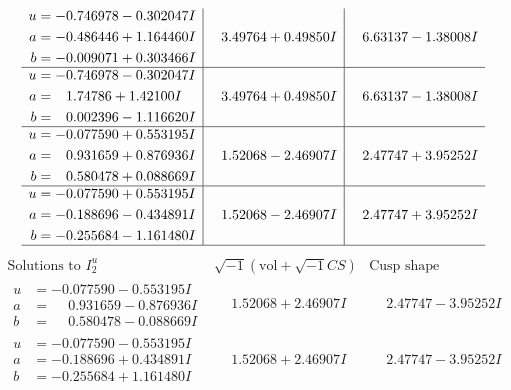 \documentclass[1p]{elsarticle_modified}
\theoremstyle{definition}
\newcommand{\I}{\sqrt{-1}}
\begin{document}
$$\begin{array}{c|c|c}
\begin{aligned}
u &= -0.746978 - 0.302047 I \\
a &= -0.486446 + 1.164460 I \\
b &= -0.009071 + 0.303466 I\end{aligned}
 & \phantom{-}3.49764 + 0.49850 I & \phantom{-}6.63137 - 1.38008 I \\ \hline\begin{aligned}
u &= -0.746978 - 0.302047 I \\
a &= \phantom{-}1.74786 + 1.42100 I \\
b &= \phantom{-}0.002396 - 1.116620 I\end{aligned}
 & \phantom{-}3.49764 + 0.49850 I & \phantom{-}6.63137 - 1.38008 I \\ \hline\begin{aligned}
u &= -0.077590 + 0.553195 I \\
a &= \phantom{-}0.931659 + 0.876936 I \\
b &= \phantom{-}0.580478 + 0.088669 I\end{aligned}
 & \phantom{-}1.52068 - 2.46907 I & \phantom{-}2.47747 + 3.95252 I \\ \hline\begin{aligned}
u &= -0.077590 + 0.553195 I \\
a &= -0.188696 - 0.434891 I \\
b &= -0.255684 - 1.161480 I\end{aligned}
 & \phantom{-}1.52068 - 2.46907 I & \phantom{-}2.47747 + 3.95252 I\\
 \hline 
 \end{array}$$\newpage$$\begin{array}{c|c|c}  
\text{Solutions to }I^u_{2}& \I (\text{vol} + \sqrt{-1}CS) & \text{Cusp shape}\\
 \hline 
\begin{aligned}
u &= -0.077590 - 0.553195 I \\
a &= \phantom{-}0.931659 - 0.876936 I \\
b &= \phantom{-}0.580478 - 0.088669 I\end{aligned}
 & \phantom{-}1.52068 + 2.46907 I & \phantom{-}2.47747 - 3.95252 I \\ \hline\begin{aligned}
u &= -0.077590 - 0.553195 I \\
a &= -0.188696 + 0.434891 I \\
b &= -0.255684 + 1.161480 I\end{aligned}
 & \phantom{-}1.52068 + 2.46907 I & \phantom{-}2.47747 - 3.95252 I \\ \hline\begin{aligned}

\end{aligned}
\end{array}$$
\end{document}
